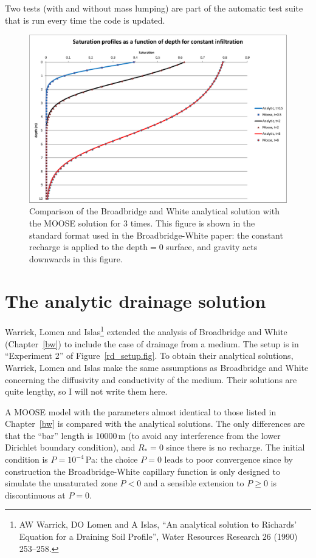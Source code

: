 \documentclass[]{scrreprt}
\begin{document}
Two tests (with and without mass lumping) are part of the automatic
test suite that is run every time the code is updated.

\begin{figure}[htb]
\centering
\includegraphics[width=16cm]{bw.eps}
\caption{Comparison of the Broadbridge and White analytical solution
  with the MOOSE solution for 3 times.  This figure is shown in the
  standard format used in the Broadbridge-White paper: the constant
  recharge is applied to the $\mbox{depth}=0$ surface, and gravity
  acts downwards in this figure.}
\label{bw.fig}
\end{figure}





\chapter{The analytic drainage solution}
\label{wli}

Warrick, Lomen and Islas\footnote{AW Warrick, DO Lomen and A Islas,
  ``An analytical solution to Richards' Equation for a Draining Soil
  Profile'', Water Resources Research 26 (1990) 253--258.} extended
the analysis of Broadbridge and White (Chapter~\ref{bw}) to include
the case of drainage from a medium.  The setup is in ``Experiment 2'' of
Figure~\ref{rd_setup.fig}.  To obtain their analytical
solutions, Warrick, Lomen and Islas make the same assumptions as
Broadbridge and White concerning the diffusivity and conductivity of
the medium.  Their solutions are quite lengthy, so I will not write
them here.

A MOOSE model with the parameters almost identical to those listed in
Chapter~\ref{bw} is compared with the analytical solutions.  The only
differences are that the ``bar'' length is 10000\,m (to avoid any
interference from the lower Dirichlet boundary condition), and
$R_{\ast}=0$ since there is no recharge.  The initial condition is
$P=10^{-4}$\,Pa: the choice $P=0$ leads to poor convergence since
by construction the Broadbridge-White capillary function is only
designed to simulate the unsaturated zone $P<0$ and a sensible
extension to $P\geq 0$ is discontinuous at $P=0$.
\end{document}
